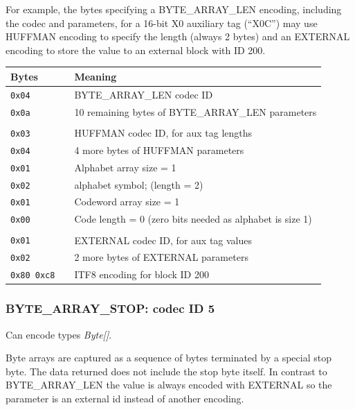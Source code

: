 \documentclass[a4paper]{article}
\begin{document}
For example, the bytes specifying a BYTE\_ARRAY\_LEN encoding, including the codec and parameters, for a 16-bit X0 auxiliary tag (``X0C'') may use HUFFMAN encoding to specify the length (always 2 bytes) and an EXTERNAL encoding to store the value to an external block with ID 200.

\begin{tabular}{lll}
\hline
\textbf{Bytes} & & \textbf{Meaning}\\
\hline
\texttt{0x04}         & & BYTE\_ARRAY\_LEN codec ID                                    \\
\texttt{0x0a}         & & 10 remaining bytes of BYTE\_ARRAY\_LEN parameters            \\
\\
\texttt{0x03}         & & HUFFMAN codec ID, for aux tag lengths                        \\
\texttt{0x04}         & & 4 more bytes of HUFFMAN parameters                           \\
\texttt{0x01}         & & Alphabet array size = 1                                      \\
\texttt{0x02}         & & alphabet symbol; (length = 2)                                \\
\texttt{0x01}         & & Codeword array size = 1                                      \\
\texttt{0x00}         & & Code length = 0 (zero bits needed as alphabet is size 1)     \\
\\
\texttt{0x01}         & & EXTERNAL codec ID, for aux tag values                        \\
\texttt{0x02}         & & 2 more bytes of EXTERNAL parameters                          \\
\texttt{0x80 0xc8}    & & ITF8 encoding for block ID 200                               \\
\hline
\end{tabular}



\subsubsection*{BYTE\_ARRAY\_STOP: codec ID 5}

Can encode types \textit{Byte[]}.

Byte arrays are captured as a sequence of bytes terminated by a special stop byte.
The data returned does not include the stop byte itself.
In contrast to BYTE\_ARRAY\_LEN the value is always encoded with EXTERNAL so the parameter is an external id instead of another encoding.
\end{document}
